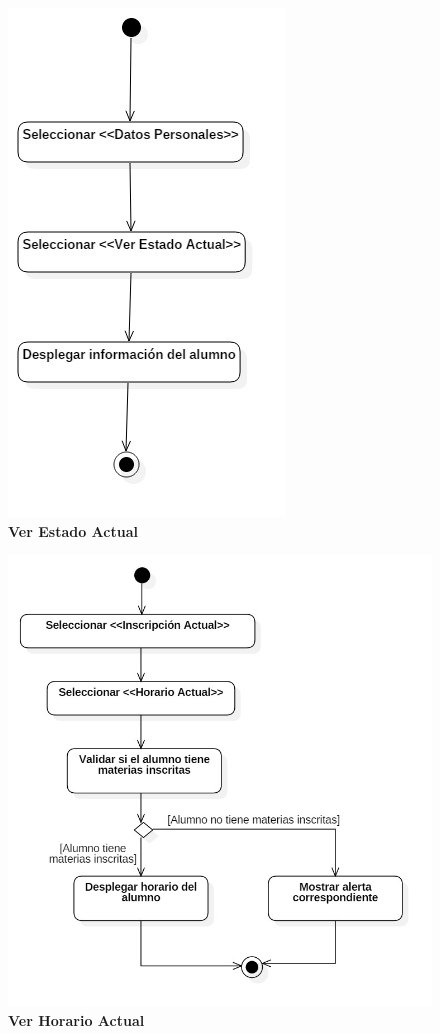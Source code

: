 \begin{figure}[H]
  \centering
    \includegraphics[scale=.8,angle=0]{project/Actividades/edoactual.jpg}
  \caption{\textbf{Ver Estado Actual}}
\end{figure}
\begin{figure}[H]
  \centering
    \includegraphics[scale=.7,angle=0]{project/Actividades/A_ver_horario_actual.jpg}
  \caption{\textbf{Ver Horario Actual}}
\end{figure}

